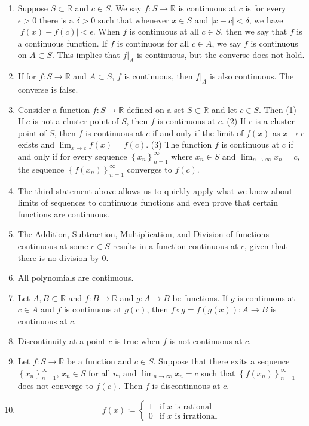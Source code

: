 \documentclass[12pt]{article}
\newcommand{\limit}[1]{\displaystyle \lim_{ {#1} }}
\newcommand{\limtoinf}[1][n]{\displaystyle\lim_{ {#1} \to \infty}}
\newcommand{\abs}[1]{\left| {#1} \right|}
\newcommand{\seq}[2][n]{\left\{ {#2} \right\}_{#1=1}^\infty}
\newcommand{\bR}{\mathbb{R}}
\begin{document}
\begin{enumerate}
	\item Suppose $S\subset\bR$ and $c\in S$. We say $f:S\to\bR$ is continuous at $c$ is for every $\epsilon>0$ there is a $\delta>0$ such that whenever $x\in S$ and $\abs{x-c}<\delta$, we have $\abs{f(x)-f(c)}<\epsilon$. When $f$ is continuous at all $c\in S$, then we say that $f$ is a continuous function. If $f$ is continuous for all $c\in A$, we say $f$ is continuous on $A\subset S$. This implies that $f|_A$ is continuous, but the converse does not hold.
	\item If for $f:S\to\bR$ and $A\subset S$, $f$ is continuous, then $f|_A$ is also continuous. The converse is false.
	\item Consider a function $f:S\to\bR$ defined on a set $S\subset\bR$ and let $c\in S$. Then (1) If $c$ is not a cluster point of $S$, then $f$ is continuous at $c$. (2) If $c$ is a cluster point of $S$, then $f$ is continuous at $c$ if and only if the limit of $f(x)$ as $x\to c$ exists and $\limit{x\to c}f(x)=f(c)$. (3) The function $f$ is continuous at $c$ if and only if for every sequence $\seq{x_n}$ where $x_n\in S$ and $\limtoinf x_n=c$, the sequence $\seq{f(x_n)}$ converges to $f(c)$.
	\item The third statement above allows us to quickly apply what we know about limits of sequences to continuous functions and even prove that certain functions are continuous.
	\item The Addition, Subtraction, Multiplication, and Division of functions continuous at some $c\in S$ results in a function continuous at $c$, given that there is no division by 0.
	\item All polynomials are continuous.
	\item Let $A,B\subset\bR$ and $f:B\to\bR$ and $g:A\to B$ be functions. If $g$ is continuous at $c\in A$ and $f$ is continuous at $g(c)$, then $f \circ g=f(g(x)):A\to B$ is continuous at $c$.
	\item Discontinuity at a point $c$ is true when $f$ is not continuous at $c$.
	\item Let $f:S\to\bR$ be a function and $c\in S$. Suppose that there exits a sequence $\seq{x_n}$, $x_n\in S$ for all $n$, and $\limtoinf x_n=c$ such that $\seq{f(x_n)}$ does not converge to $f(c)$. Then $f$ is discontinuous at $c$.
	\item \[f(x)\coloneq
	\begin{cases}
		1 & \text{if }x\text{ is rational} \\
		0 & \text{if }x\text{ is irrational}

\end{cases}\]
\end{enumerate}
\end{document}
